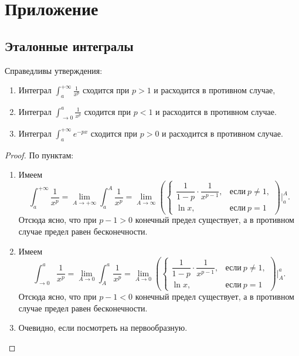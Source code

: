 \section{Приложение}

\subsection{Эталонные интегралы}

\begin{lemma}
	Справедливы утверждения:
	\begin{enumerate}
		\item Интеграл \(\displaystyle \int_a^{+\infty} \frac{1}{x^p}\) сходится при \(p > 1\) и расходится в противном случае,
		\item Интеграл \(\displaystyle \int_{\to 0}^a \frac{1}{x^p}\) сходится при \(p < 1\) и расходится в противном случае.
		\item Интеграл \(\displaystyle \int_a^{+\infty} e^{-p x}\) сходится при \(p > 0\) и расходится в противном случае.
	\end{enumerate}
	
\end{lemma}
\begin{proof}
	По пунктам:
	\begin{enumerate}
		\item Имеем \[
		\int_a^{+\infty} \frac{1}{x^p} = \lim_{A \to +\infty} \int_a^A \frac{1}{x^p} = \lim_{A 	\to \infty} \left(
		\begin{cases}
			\dfrac{1}{1 - p} \cdot \dfrac{1}{x^{p - 1}}, &\text{если} \ p \neq 1, \\
			\ln x, 									   &\text{если} \ p = 1
		\end{cases}
		\right) \bigg|_a^A.
		\]
		Отсюда ясно, что при \(p - 1 > 0\) конечный предел существует, а в противном случае предел равен бесконечности.
		\item Имеем \[
		\int_{\to 0}^a \frac{1}{x^p} = \lim_{A \to 0} \int_A^a \frac{1}{x^p} = \lim_{A 	\to 0} \left(
		\begin{cases}
			\dfrac{1}{1 - p} \cdot \dfrac{1}{x^{p - 1}}, &\text{если} \ p \neq 1, \\
			\ln x, 									   &\text{если} \ p = 1
		\end{cases}
		\right) \bigg|_A^a.
		\]
		Отсюда ясно, что при \(p - 1 < 0\) конечный предел существует, а в противном случае предел равен бесконечности.
		\item Очевидно, если посмотреть на первообразную.
	\end{enumerate}
\end{proof}

